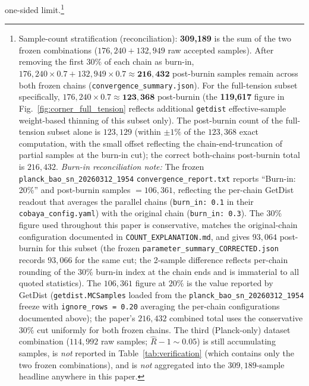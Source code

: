 \documentclass[aps,prd,twocolumn,superscriptaddress,showpacs,preprintnumbers,nofootinbib,longbibliography,floatfix]{revtex4-2}
\begin{document}
one-sided limit.\footnote{\label{fn:sample_stratification}Sample-count
stratification (reconciliation): \textbf{309{,}189} is
the sum of the two frozen combinations ($176{,}240 + 132{,}949$ raw accepted
samples). After removing the first $30\%$ of each chain as burn-in,
$176{,}240 \times 0.7 + 132{,}949 \times 0.7 \approx \mathbf{216{,}432}$
post-burnin samples remain across both frozen chains
(\texttt{convergence\_summary.json}). For the full-tension subset specifically,
$176{,}240 \times 0.7 \approx \mathbf{123{,}368}$ post-burnin (the
\textbf{119{,}617} figure in Fig.~\ref{fig:corner_full_tension} reflects
additional \texttt{getdist} effective-sample weight-based thinning of this
subset only). The post-burnin count of the full-tension subset alone is $123{,}129$ (within $\pm\!1\%$ of the $123{,}368$ exact computation, with the small offset reflecting the chain-end-truncation of partial samples at the burn-in cut); the correct both-chains post-burnin total is $216{,}432$.
\emph{Burn-in reconciliation note:} The frozen
\texttt{planck\_bao\_sn\_20260312\_1954} \texttt{convergence\_report.txt}
reports ``Burn-in: 20\%'' and post-burnin samples $= 106{,}361$, reflecting
the per-chain GetDist readout that averages the parallel chains
(\texttt{burn\_in: 0.1} in their \texttt{cobaya\_config.yaml}) with the
original chain (\texttt{burn\_in: 0.3}).  The $30\%$ figure used throughout
this paper is conservative, matches the original-chain configuration documented
in \texttt{COUNT\_EXPLANATION.md}, and gives $93{,}064$ post-burnin for this
subset (the frozen
\texttt{parameter\_summary\_CORRECTED.json} records $93{,}066$ for the same
cut; the 2-sample difference reflects per-chain rounding of the $30\%$
burn-in index at the chain ends and is immaterial to all quoted
statistics).  The $106{,}361$ figure at $20\%$ is the value reported by GetDist
(\texttt{getdist.MCSamples} loaded from the
\texttt{planck\_bao\_sn\_20260312\_1954} freeze with
\texttt{ignore\_rows = 0.20} averaging the per-chain configurations
documented above); the
paper's $216{,}432$ combined total uses the conservative $30\%$ cut uniformly
for both frozen chains.
The third (Planck-only)
dataset combination ($114{,}992$ raw samples; $\hat R - 1 \sim 0.05$) is
still accumulating samples, is \emph{not} reported in
Table~\ref{tab:verification} (which contains only the two frozen
combinations), and is \emph{not} aggregated into the
$309{,}189$-sample headline anywhere in this paper.}
\end{document}

